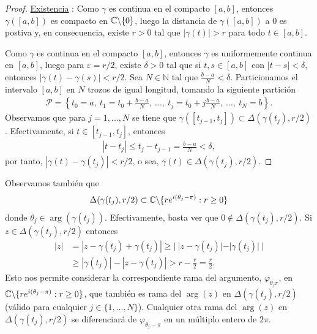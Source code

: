 \begin{proof}
    \underline{Existencia} : Como $\gamma$ es continua en el compacto $[a,b]$, entonces $\gamma([a,b])$ es compacto en $\mathbb{C} \backslash \{0\}$, luego la distancia de $\gamma([a,b])$ a $0$ es postiva y, en consecuencia, existe $r > 0$ tal que $|\gamma(t)| > r$ para todo $t \in [a,b]$.

    Como $\gamma$ es continua en el compacto $[a,b]$, entonces $\gamma$ es uniformemente continua en $[a,b]$, luego para $\varepsilon = r/2$, existe $\delta > 0$ tal que si $t,s \in [a,b]$ con $|t - s| < \delta$, entonces $|\gamma(t) - \gamma(s)| < r/2$. Sea $N \in \mathbb{N}$ tal que $\frac{b - a}{N} < \delta$. Particionamos el intervalo $[a,b]$ en $N$ trozos de igual longitud, tomando la siguiente partición
    \begin{align*}
        \mathcal{P} = \left\{ t_0 = a, \ t_1 = t_0 + \frac{b - a}{N}, \ ..., \ t_j = t_0 + j\frac{b - a}{N}, \ ..., \ t_N = b \right\}.
    \end{align*}
    Observamos que para $j = 1,...,N$ se tiene que $\gamma([t_{j-1}, t_j]) \subset \Delta(\gamma(t_j), r/2)$. Efectivamente, si $t \in [t_{j-1},t_j]$, entonces
    \begin{align*}
        |t - t_j| \leq t_j - t_{j-1} = \frac{b - a}{N} < \delta,
    \end{align*}
    por tanto, $|\gamma(t) - \gamma(t_j)| < r/2$, o sea, $\gamma(t) \in \Delta(\gamma(t_j), r/2)$.
\end{proof}
Observamos también que
\begin{align*}
    \Delta(\gamma(t_j), r/2) \subset \mathbb{C} \backslash \{ re^{i(\theta_j - \pi)} : r \ge 0\}
\end{align*}
donde $\theta_j \in \arg(\gamma(t_j))$. Efectivamente, basta ver que $0 \not \in \Delta(\gamma(t_j), r/2)$. Si $z \in \Delta(\gamma(t_j), r/2)$ entonces
\begin{align*}
    |z| & = |z - \gamma(t_j) + \gamma(t_j)| \ge | \ |z - \gamma(t_j)| - |\gamma(t_j)| \ | \\
        & \ge |\gamma(t_j)| - |z - \gamma(t_j)| > r - \frac{r}{2} = \frac{r}{2}.
\end{align*}
Esto nos permite considerar la correspondiente rama del argumento, $\varphi_{\theta_j \pi}$, en $\mathbb{C} \backslash \{ re^{i(\theta_j - \pi)} : r \ge 0\}$, que también es rama del $\arg(z)$ en $\Delta(\gamma(t_j), r/2)$ (válido para cualquier $j \in \{1,...,N\}$). Cualquier otra rama del $\arg(z)$ en $\Delta(\gamma(t_j), r/2)$ se diferenciará de $\varphi_{\theta_j - \pi}$ en un múltiplo entero de $2\pi$.

